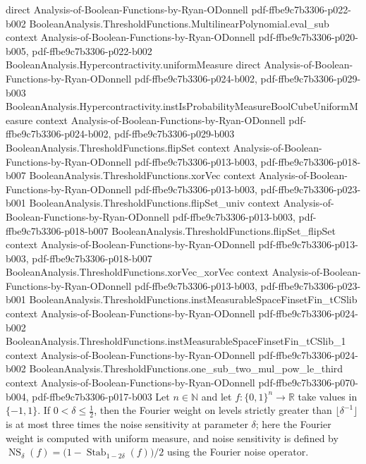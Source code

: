 \begin{lemma}
  {direct}
  {Analysis-of-Boolean-Functions-by-Ryan-ODonnell}
  {pdf-ffbe9c7b3306-p022-b002}
\proofstep
  {BooleanAnalysis.ThresholdFunctions.MultilinearPolynomial.eval_sub}
  {context}
  {Analysis-of-Boolean-Functions-by-Ryan-ODonnell}
  {pdf-ffbe9c7b3306-p020-b005,
    pdf-ffbe9c7b3306-p022-b002}
\proofstep
  {BooleanAnalysis.Hypercontractivity.uniformMeasure}
  {direct}
  {Analysis-of-Boolean-Functions-by-Ryan-ODonnell}
  {pdf-ffbe9c7b3306-p024-b002,
    pdf-ffbe9c7b3306-p029-b003}
\proofstep
  {BooleanAnalysis.Hypercontractivity.instIsProbabilityMeasureBoolCubeUniformMeasure}
  {context}
  {Analysis-of-Boolean-Functions-by-Ryan-ODonnell}
  {pdf-ffbe9c7b3306-p024-b002,
    pdf-ffbe9c7b3306-p029-b003}
\proofstep
  {BooleanAnalysis.ThresholdFunctions.flipSet}
  {context}
  {Analysis-of-Boolean-Functions-by-Ryan-ODonnell}
  {pdf-ffbe9c7b3306-p013-b003,
    pdf-ffbe9c7b3306-p018-b007}
\proofstep
  {BooleanAnalysis.ThresholdFunctions.xorVec}
  {context}
  {Analysis-of-Boolean-Functions-by-Ryan-ODonnell}
  {pdf-ffbe9c7b3306-p013-b003,
    pdf-ffbe9c7b3306-p023-b001}
\proofstep
  {BooleanAnalysis.ThresholdFunctions.flipSet_univ}
  {context}
  {Analysis-of-Boolean-Functions-by-Ryan-ODonnell}
  {pdf-ffbe9c7b3306-p013-b003,
    pdf-ffbe9c7b3306-p018-b007}
\proofstep
  {BooleanAnalysis.ThresholdFunctions.flipSet_flipSet}
  {context}
  {Analysis-of-Boolean-Functions-by-Ryan-ODonnell}
  {pdf-ffbe9c7b3306-p013-b003,
    pdf-ffbe9c7b3306-p018-b007}
\proofstep
  {BooleanAnalysis.ThresholdFunctions.xorVec_xorVec}
  {context}
  {Analysis-of-Boolean-Functions-by-Ryan-ODonnell}
  {pdf-ffbe9c7b3306-p013-b003,
    pdf-ffbe9c7b3306-p023-b001}
\proofstep
  {BooleanAnalysis.ThresholdFunctions.instMeasurableSpaceFinsetFin_tCSlib}
  {context}
  {Analysis-of-Boolean-Functions-by-Ryan-ODonnell}
  {pdf-ffbe9c7b3306-p024-b002}
\proofstep
  {BooleanAnalysis.ThresholdFunctions.instMeasurableSpaceFinsetFin_tCSlib_1}
  {context}
  {Analysis-of-Boolean-Functions-by-Ryan-ODonnell}
  {pdf-ffbe9c7b3306-p024-b002}
\proofstep
  {BooleanAnalysis.ThresholdFunctions.one_sub_two_mul_pow_le_third}
  {context}
  {Analysis-of-Boolean-Functions-by-Ryan-ODonnell}
  {pdf-ffbe9c7b3306-p070-b004,
    pdf-ffbe9c7b3306-p017-b003}
Let $n\in\mathbb N$ and let $f:\{0,1\}^n\to\mathbb R$ take values in $\{-1,1\}$. If
$0<\delta\le\tfrac12$, then the Fourier weight on levels strictly greater than
$\lfloor\delta^{-1}\rfloor$ is at most three times the noise sensitivity at parameter
$\delta$; here the Fourier weight is computed with uniform measure, and noise
sensitivity is defined by
$\operatorname{NS}_\delta(f)=\bigl(1-\operatorname{Stab}_{1-2\delta}(f)\bigr)/2$ using
the Fourier noise operator.
\end{lemma}

